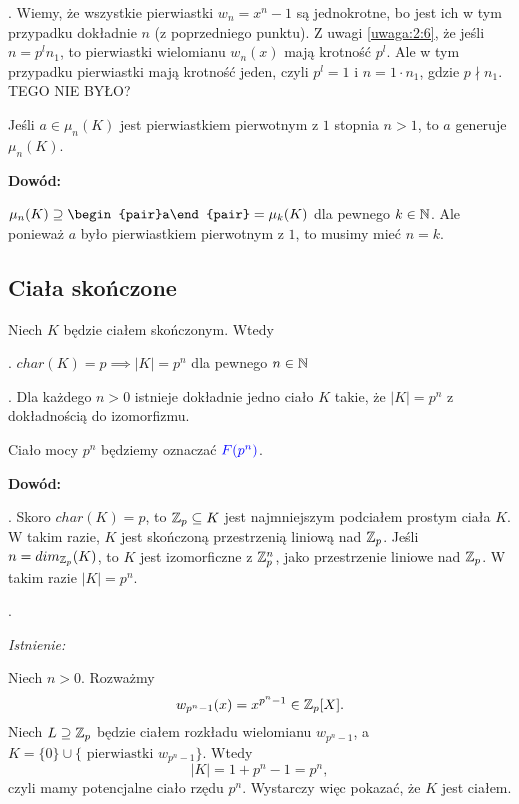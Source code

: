 
. Wiemy, że wszystkie pierwiastki $w_n=x^n-1$ są jednokrotne, bo jest ich w tym przypadku dokładnie $n$ (z poprzedniego punktu). Z uwagi \ref{uwaga:2:6}, że jeśli $n=p^ln_1$, to pierwiastki wielomianu $w_n(x)$ mają krotność $p^l$. Ale w tym przypadku pierwiastki mają krotność jeden, czyli $p^l=1$ i $n=1\cdot n_1$, gdzie $p\nmid n_1$. {\color{orange}\large TEGO NIE BYŁO?}

\begin{wniosek}
    Jeśli $a\in \mu_n(K)$ jest pierwiastkiem pierwotnym z $1$ stopnia $n>1$, to $a$ generuje $\mu_n(K)$.
\end{wniosek}

\textbf{Dowód:}

$\mu_n(K)\supseteq\begin{pair}a\end{pair}=\mu_k(K)$ dla pewnego $k\in\mathbb{N}$. Ale ponieważ $a$ było pierwiastkiem pierwotnym z $1$, to musimy mieć $n=k$.

\subsection{Ciała skończone}

\begin{tw}
    Niech $K$ będzie ciałem skończonym. Wtedy

. $char(K)=p\implies |K|=p^n$ dla pewnego $n\in\mathbb{N}$

. Dla każdego $n>0$ istnieje dokładnie jedno ciało $K$ takie, że $|K|=p^n$ z dokładnością do izomorfizmu.

Ciało mocy $p^n$ będziemy oznaczać $\color{blue}F(p^n)$.
\end{tw}

\textbf{Dowód:}

. Skoro $char(K)=p$, to $\mathbb{Z}_p\subseteq K$ jest najmniejszym podciałem prostym ciała $K$. W takim razie, $K$ jest skończoną przestrzenią liniową nad $\mathbb{Z}_p$. Jeśli $n=dim_{\mathbb{Z}_p}(K)$, to $K$ jest izomorficzne z $\mathbb{Z}_p^n$, jako przestrzenie liniowe nad $\mathbb{Z}_p$. W takim razie $|K|=p^n$.

. 

\emph{Istnienie:}

Niech $n>0$. Rozważmy 
$$w_{p^{n}-1}(x)=x^{p^n-1}\in\mathbb{Z}_p[X].$$
Niech $L\supseteq\mathbb{Z}_p$ będzie ciałem rozkładu wielomianu $w_{p^n-1}$, a $K=\{0\}\cup\{\text{ pierwiastki }w_{p^n-1}\}$. Wtedy
$$|K|=1+p^n-1=p^n,$$
czyli mamy potencjalne ciało rzędu $p^n$. Wystarczy więc pokazać, że $K$ jest ciałem.

